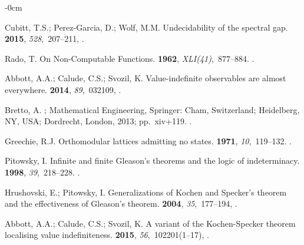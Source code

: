\documentclass[axioms,article,accept,oneauthor,pdftex]{Definitions/mdpi}
\begin{document}
\begin{adjustwidth}{-\extralength}{0cm}
\begin{thebibliography}{999}
Cubitt, T.S.; Perez-Garcia, D.; Wolf, M.M.
\newblock Undecidability of the spectral gap.
 {\bf 2015}, {\em 528},~207--211,
.

Rado, T.
\newblock On Non-Computable Functions.
 {\bf 1962}, {\em
  XLI(41)},~877--884.
.

Abbott, A.A.; Calude, C.S.; Svozil, K.
\newblock Value-indefinite observables are almost everywhere.
 {\bf 2014}, {\em 89},~032109,
.

Bretto, A.
; Mathematical Engineering, Springer: Cham, Switzerland;
  Heidelberg, NY, USA; Dordrecht, London,  2013; pp.~xiv+119.
.

Greechie, R.J.
\newblock Orthomodular lattices admitting no states.
 {\bf 1971}, {\em
  10},~119--132.
.

Pitowsky, I.
\newblock Infinite and finite {G}leason's theorems and the logic of
  indeterminacy.
 {\bf 1998}, {\em 39},~218--228.
.

Hrushovski, E.; Pitowsky, I.
\newblock Generalizations of {K}ochen and {S}pecker's theorem and the
  effectiveness of {G}leason's theorem.
 {\bf 2004}, {\em 35},~177--194,
.

Abbott, A.A.; Calude, C.S.; Svozil, K.
\newblock A variant of the {K}ochen-{S}pecker theorem localising value
  indefiniteness.
 {\bf 2015}, {\em
  56},~102201(1--17),
.


\end{thebibliography}
\end{adjustwidth}
\end{document}

